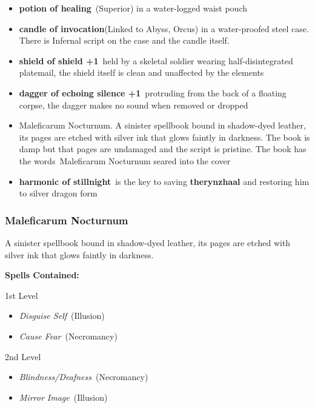 \documentclass[10pt,twocolumn]{article}
\renewcommand{\textsc}[1]{\XCharterSC#1}
\let\oldtextbf\textbf
\renewcommand{\textbf}[1]{\oldtextbf{{#1}}}
\providecommand{\tightlist}{
  \setlength{\itemsep}{4pt}
  \setlength{\topsep}{0pt}
  \setlength{\parsep}{0pt}
  \setlength{\parskip}{0pt}
  \setlength{\partopsep}{0pt}
}
\begin{document}
\begin{itemize}
\tightlist
\item
  \textcolor{keywordcolor}{\textbf{\textsc{potion of healing}}}~(Superior)
  in a water-logged waist pouch
\item
  \textcolor{keywordcolor}{\textbf{\textsc{candle of invocation}}}(Linked
  to Abyss, Orcus) in a water-proofed steel case. There is Infernal
  script on the case and the candle itself.
\item
  \textcolor{keywordcolor}{\textbf{\textsc{shield of shield +1}}}~held
  by a skeletal soldier wearing half-disintegrated platemail, the shield
  itself is clean and unaffected by the elements
\item
  \textcolor{keywordcolor}{\textbf{\textsc{dagger of echoing silence +1}}}~protruding
  from the back of a floating corpse, the dagger makes no sound when
  removed or dropped
\item
  Maleficarum Nocturnum. A sinister spellbook bound in shadow-dyed
  leather, its pages are etched with silver ink that glows faintly in
  darkness. The book is damp but that pages are undamaged and the script
  is pristine. The book has the words~Maleficarum Nocturnum seared into
  the cover
\item
  \textcolor{keywordcolor}{\textbf{\textsc{harmonic of stillnight}}}~is
  the key to saving
  \textcolor{keywordcolor}{\textbf{\textsc{therynzhaal}}} and restoring
  him to silver dragon form
\end{itemize}

\subsubsection{Maleficarum Nocturnum}\label{maleficarum-nocturnum}

A sinister spellbook bound in shadow-dyed leather, its pages are etched
with silver ink that glows faintly in darkness.

\textbf{Spells Contained:}

1st Level

\begin{itemize}
\tightlist
\item
  \emph{Disguise Self}~(Illusion)
\item
  \emph{Cause Fear}~(Necromancy)
\end{itemize}

2nd Level

\begin{itemize}
\tightlist
\item
  \emph{Blindness/Deafness}~(Necromancy)
\item
  \emph{Mirror Image}~(Illusion)
\end{itemize}
\end{document}
